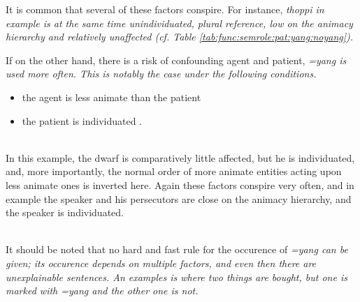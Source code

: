 It is common that several of these factors conspire. For instance, \em thoppi \em in example  is at the same time unindividuated, plural reference, low on the animacy hierarchy and relatively unaffected (cf. Table \ref{tab:func:semrole:pat:yang:noyang}).

If on the other hand, there is a risk of confounding agent and patient, \em =yang \em is used more often. This is notably the
case under the following conditions.

\begin{itemize}
 \item   the agent is less animate than the patient 
 \item   the patient is  individuated .
\end{itemize}


 \\
In this example, the dwarf is comparatively little affected, but he is individuated, and, more importantly, the normal order of more animate entities acting upon less animate ones is inverted here.
Again these factors conspire very often, and in example  the speaker and his persecutors are close on the animacy hierarchy, and the speaker is individuated.

\\

It should be noted that no hard and fast rule for the occurence of \em =yang \em can be given; its occurence depends on multiple factors, and even then there are unexplainable sentences. An examples is  where two things are bought, but one is marked with \em =yang \em and the other one is not.

\\

